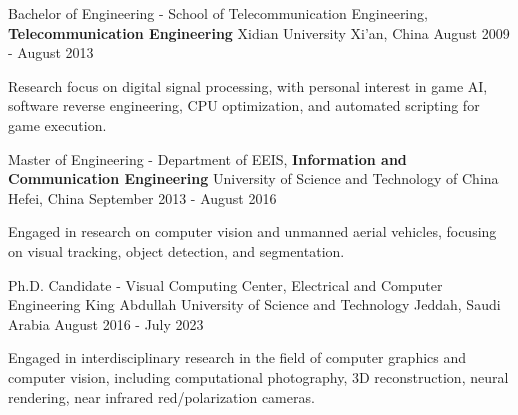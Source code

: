

\begin{cventries}
	
\cventry
{Bachelor of Engineering - School of Telecommunication Engineering, \textbf{Telecommunication Engineering} } %
{Xidian University} %
{Xi'an, China} %
{August 2009 - August 2013} %
{
	\begin{cvitems} %
		\item {Research focus on digital signal processing, with personal interest in game AI, software reverse engineering, CPU optimization, and automated scripting for game execution.}
	\end{cvitems}
}

\cventry
{Master of Engineering - Department of EEIS, \textbf{Information and Communication Engineering}} %
{University of Science and Technology of China} %
{Hefei, China} %
{September 2013 - August 2016} %
{
	\begin{cvitems} %
		\item {Engaged in research on computer vision and unmanned aerial vehicles, focusing on visual tracking, object detection, and segmentation.}
	\end{cvitems}
}

\cventry
{Ph.D. Candidate - Visual Computing Center, Electrical and Computer Engineering} %
{King Abdullah University of Science and Technology} %
{Jeddah, Saudi Arabia} %
{August 2016 - July 2023} %
{
	\begin{cvitems} %
		\item {Engaged in interdisciplinary research in the field of computer graphics and computer vision, including computational photography, 3D reconstruction, neural rendering, near infrared red/polarization cameras.}
	\end{cvitems}
}

\end{cventries}

